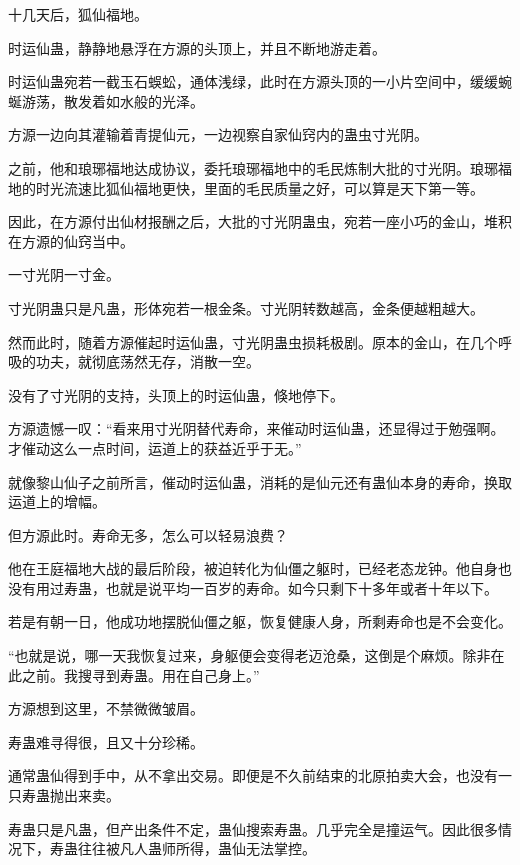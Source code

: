 
\begin{this_body}

十几天后，狐仙福地。

时运仙蛊，静静地悬浮在方源的头顶上，并且不断地游走着。

时运仙蛊宛若一截玉石蜈蚣，通体浅绿，此时在方源头顶的一小片空间中，缓缓蜿蜒游荡，散发着如水般的光泽。

方源一边向其灌输着青提仙元，一边视察自家仙窍内的蛊虫寸光阴。

之前，他和琅琊福地达成协议，委托琅琊福地中的毛民炼制大批的寸光阴。琅琊福地的时光流速比狐仙福地更快，里面的毛民质量之好，可以算是天下第一等。

因此，在方源付出仙材报酬之后，大批的寸光阴蛊虫，宛若一座小巧的金山，堆积在方源的仙窍当中。

一寸光阴一寸金。

寸光阴蛊只是凡蛊，形体宛若一根金条。寸光阴转数越高，金条便越粗越大。

然而此时，随着方源催起时运仙蛊，寸光阴蛊虫损耗极剧。原本的金山，在几个呼吸的功夫，就彻底荡然无存，消散一空。

没有了寸光阴的支持，头顶上的时运仙蛊，倏地停下。

方源遗憾一叹：“看来用寸光阴替代寿命，来催动时运仙蛊，还显得过于勉强啊。才催动这么一点时间，运道上的获益近乎于无。”

就像黎山仙子之前所言，催动时运仙蛊，消耗的是仙元还有蛊仙本身的寿命，换取运道上的增幅。

但方源此时。寿命无多，怎么可以轻易浪费？

他在王庭福地大战的最后阶段，被迫转化为仙僵之躯时，已经老态龙钟。他自身也没有用过寿蛊，也就是说平均一百岁的寿命。如今只剩下十多年或者十年以下。

若是有朝一日，他成功地摆脱仙僵之躯，恢复健康人身，所剩寿命也是不会变化。

“也就是说，哪一天我恢复过来，身躯便会变得老迈沧桑，这倒是个麻烦。除非在此之前。我搜寻到寿蛊。用在自己身上。”

方源想到这里，不禁微微皱眉。

寿蛊难寻得很，且又十分珍稀。

通常蛊仙得到手中，从不拿出交易。即便是不久前结束的北原拍卖大会，也没有一只寿蛊抛出来卖。

寿蛊只是凡蛊，但产出条件不定，蛊仙搜索寿蛊。几乎完全是撞运气。因此很多情况下，寿蛊往往被凡人蛊师所得，蛊仙无法掌控。


\end{this_body}
